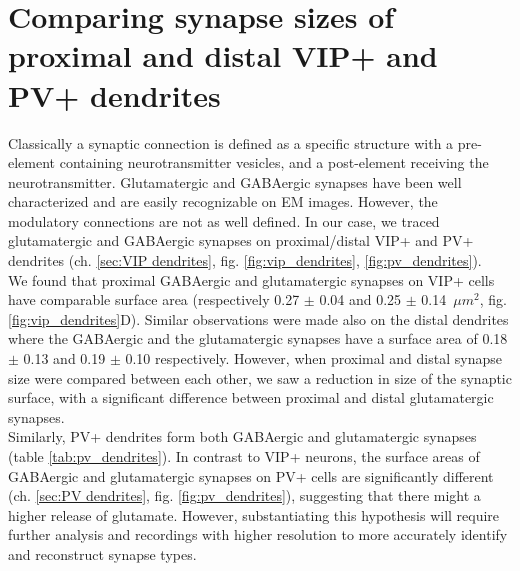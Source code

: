 \section{Comparing synapse sizes of proximal and distal VIP+ and PV+ dendrites}
Classically a synaptic connection is defined as a specific structure with a pre-element containing neurotransmitter vesicles, and a post-element receiving the neurotransmitter. Glutamatergic and GABAergic synapses have been well characterized and are easily recognizable on  EM images. However, the modulatory connections are not as well defined. In our case, we traced glutamatergic and GABAergic synapses on proximal/distal VIP+ and PV+ dendrites (ch. \ref{sec:VIP dendrites}, fig. \ref{fig:vip_dendrites}, \ref{fig:pv_dendrites}). \\ 
We found that proximal GABAergic and glutamatergic synapses on VIP+ cells have comparable surface area (respectively 0.27 $\pm$ 0.04 and 0.25 $\pm$ 0.14~$\mu m^2$, fig. \ref{fig:vip_dendrites}D). Similar observations were made also on the distal dendrites where the GABAergic and the glutamatergic synapses have a surface area of 0.18 $ \pm $ 0.13 and 0.19 $ \pm $ 0.10 respectively. However, when proximal and distal synapse size were compared between each other, we saw a reduction in size of the synaptic surface, with a significant difference between proximal and distal glutamatergic synapses. \\ 
Similarly, PV+ dendrites form both GABAergic and glutamatergic synapses (table \ref{tab:pv_dendrites}). In contrast to VIP+ neurons, the surface areas of GABAergic and glutamatergic synapses on PV+ cells are significantly different (ch. \ref{sec:PV dendrites}, fig. \ref{fig:pv_dendrites}), suggesting that there might a higher release of glutamate. However, substantiating this hypothesis will require further analysis and recordings with higher resolution to more accurately identify and reconstruct synapse types.\\
